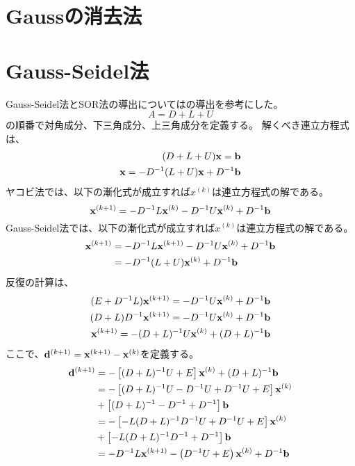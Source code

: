 \documentclass{jsarticle}
\date{\today}
\author{山田龍}
\title{}
\newcommand{\kakko}[1][]{(#1)}
\newcommand{\bx}{\bold{x}}
\newcommand{\bb}{\bold{b}}
\newcommand{\bd}{\bold{d}}
\begin{document}
\maketitle
\section{Gaussの消去法}
\section{Gauss-Seidel法}
Gauss-Seidel法とSOR法の導出については\cite{suuchi}の導出を参考にした。
\begin{equation}
    A = D + L + U
\end{equation}
の順番で対角成分、下三角成分、上三角成分を定義する。
解くべき連立方程式は、
\begin{align}
  (D + L + U)\bx = \bb  \\
  \bx = -D^{-1}(L + U)\bx +  D^{-1} \bb 
\end{align}
ヤコビ法では、以下の漸化式が成立すれば$x^{\kakko[k]}$は連立方程式の解である。
\begin{equation}
    \bx^{\kakko[k+1]} = - D^{-1} L \bx^{\kakko[k]}\\
    - D^{-1} U \bx^{\kakko[k]} + D^{-1}\bold{b} 
\end{equation}
Gauss-Seidel法では、以下の漸化式が成立すれば$x^{\kakko[k]}$は連立方程式の解である。
\begin{align}
    \bx^{\kakko[k+1]} &= - D^{-1} L \bx^{\kakko[k+1]}
    - D^{-1} U \bx^{\kakko[k]} + D^{-1}\bold{b}\\
    &=- D^{-1} (L + U) \bx^{\kakko[k]} + D^{-1}\bold{b} 
\end{align}
反復の計算は、
\begin{align*}
    (E + D^{-1}L)\bx^{\kakko[k+1]} = - D^{-1} U \bx^{\kakko[k]} + D^{-1}\bold{b}\\
    (D + L)D^{-1}\bx^{\kakko[k+1]} = - D^{-1} U \bx^{\kakko[k]} + D^{-1}\bold{b}\\
    \bx^{\kakko[k+1]} = - (D + L)^{-1}U \bx^{\kakko[k]} +(D + L)^{-1}\bold{b}\\
\end{align*}
ここで、$\bd^{\kakko[k+1]} = \bx^{\kakko[k+1]} - \bx^{\kakko[k]}$を定義する。
\begin{align*}
  \bd^{\kakko[k+1]} &= - \left[ (D + L)^{-1}U + E\right] \bx^{\kakko[k]} + (D + L)^{-1}\bb\\
  &= - \left[ (D + L)^{-1}U - D^{-1}U + D^{-1}U+ E\right] \bx^{\kakko[k]}\\
  &+ \left[(D + L)^{-1} - D^{-1} + D^{-1}\right]\bb\\
  &= - \left[ - L(D + L)^{-1}D^{-1}U + D^{-1}U+ E\right] \bx^{\kakko[k]}\\
  &+ \left[- L(D + L)^{-1}D^{-1}+ D^{-1}\right]\bb\\
  &= - D^{-1}L \bx^{\kakko[k+1]}- \left( D^{-1}U+ E\right) \bx^{\kakko[k]} + D^{-1}\bb
\end{align*}
\end{document}
